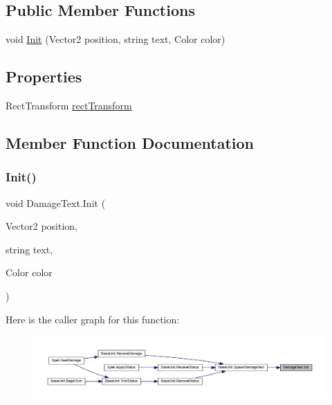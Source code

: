 \subsection*{Public Member Functions}
\begin{DoxyCompactItemize}
\item 
void \mbox{\hyperlink{class_damage_text_ab66ed998f41cdeb84c22449950170f67}{Init}} (Vector2 position, string text, Color color)
\end{DoxyCompactItemize}
\subsection*{Properties}
\begin{DoxyCompactItemize}
\item 
Rect\+Transform \mbox{\hyperlink{class_damage_text_ae6860819b6715004f9f05314039aa978}{rect\+Transform}}
\end{DoxyCompactItemize}


\subsection{Member Function Documentation}
\mbox{\label{class_damage_text_ab66ed998f41cdeb84c22449950170f67}} 
\subsubsection{\texorpdfstring{Init()}{Init()}}
{\footnotesize\ttfamily void Damage\+Text.\+Init (\begin{DoxyParamCaption}\item[{Vector2}]{position,  }\item[{string}]{text,  }\item[{Color}]{color }\end{DoxyParamCaption})}

Here is the caller graph for this function\+:\nopagebreak
\begin{figure}[H]
\begin{center}
\leavevmode
\includegraphics[width=350pt]{class_damage_text_ab66ed998f41cdeb84c22449950170f67_icgraph}
\end{center}
\end{figure}


